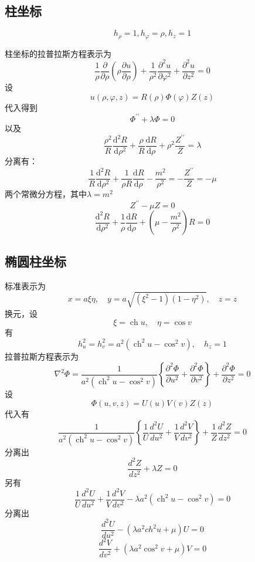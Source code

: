 \documentclass[a4paper]{ctexart}
\begin{document}
\subsection{柱坐标}

$$
    h_{\rho}=1,h_{\varphi}=\rho ,h_z=1
$$

柱坐标的拉普拉斯方程表示为
\[
    \frac{1}{\rho} \frac{\partial}{\partial \rho}\left(\rho \frac{\partial u}{\partial \rho}\right)+\frac{1}{\rho^{2}} \frac{\partial^{2} u}{\partial \varphi^{2}}+\frac{\partial^{2} u}{\partial z^{2}}=0
\]
设
\[
    u(\rho, \varphi, z)=R(\rho) \Phi(\varphi) Z(z)
\]
代入得到
\begin{equation}
    \Phi^{\prime \prime}+\lambda \Phi=0
\end{equation}
以及
\[
    \frac{\rho^{2}}{R} \frac{\mathrm{d}^{2} R}{\mathrm{d} \rho^{2}}+\frac{\rho}{R} \frac{\mathrm{d} R}{\mathrm{d} \rho}+\rho^{2} \frac{Z^{\prime \prime}}{Z}=\lambda
\]
分离有：
\[
    \frac{1}{R} \frac{\mathrm{d}^{2} R}{\mathrm{d} \rho^{2}}+\frac{1}{\rho R} \frac{\mathrm{d} R}{\mathrm{d} \rho}-\frac{m^{2}}{\rho^{2}}=-\frac{Z^{\prime \prime}}{Z}=-\mu
\]
两个常微分方程，其中$\lambda=m^2$
\begin{equation}
    Z^{\prime \prime}-\mu Z=0
\end{equation}
\begin{equation}
    \frac{\mathrm{d}^{2} R}{\mathrm{d} \rho^{2}}+\frac{1}{\rho} \frac{\mathrm{d} R}{\mathrm{d} \rho}+\left(\mu-\frac{m^{2}}{\rho^{2}}\right) R=0
\end{equation}
\subsection{椭圆柱坐标}
标准表示为
$$
    x=a \xi \eta, \quad y=a \sqrt{\left(\xi^{2}-1\right)\left(1-\eta^{2}\right)}, \quad z=z
$$
换元，设
$$\xi=\operatorname{ch} u, \quad \eta=\cos v$$
有
$$
    h_{u}^{2}=h_{v}^{2}=a^{2}\left(\operatorname{ch}^{2} u-\cos ^{2} v\right), \quad h_{z}=1
$$
拉普拉斯方程表示为
$$
    \nabla^{2} \Phi=\frac{1}{a^{2}\left(\operatorname{ch}^{2} u-\cos ^{2} v\right)}\left\{\frac{\partial^{2} \Phi}{\partial u^{2}}+\frac{\partial^{2} \Phi}{\partial v^{2}}\right\}+\frac{\partial^{2} \Phi}{\partial z^{2}}=0
$$
设
$$
    \Phi \left( u,v,z \right) =U\left( u \right) V\left( v \right) Z\left( z \right)
$$
代入有
$$
    \frac{1}{a^2\left( \operatorname{ch}^2u-\cos ^2v \right)}\left\{ \frac{1}{U}\frac{d^2U}{du^2}+\frac{1}{V}\frac{d^2V}{dv^2} \right\} +\frac{1}{Z}\frac{d^2Z}{dz^2}=0
$$
分离出
\begin{equation}
    \frac{d^2Z}{dz^2}+\lambda Z=0
\end{equation}
另有
$$
    \frac{1}{U}\frac{d^2U}{du^2}+\frac{1}{V}\frac{d^2V}{dv^2}-\lambda a^2\left( \operatorname{ch}^2u-\cos ^2v \right) = 0
$$
分离出
\begin{equation}
    \frac{d^2U}{du^2}-\left( \lambda a^2ch^2u+\mu \right) U=0
\end{equation}
\begin{equation}
    \frac{d^2V}{dv^2}+\left( \lambda a^2\cos ^2v+\mu \right) V=0
\end{equation}
\end{document}
